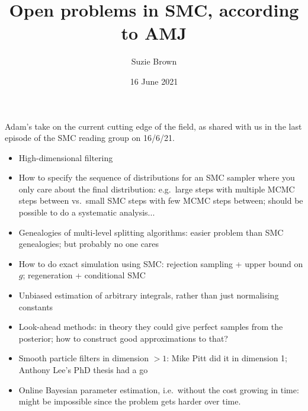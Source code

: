 \documentclass[fleqn]{article}
\title{Open problems in SMC, according to AMJ}
\author{Suzie Brown}
\date{16 June 2021}
\newcommand{\1}[1]{\mathbb{I}_{#1}}
\begin{document}
\maketitle
\thispagestyle{fancy}

Adam's take on the current cutting edge of the field, as shared with us in the last episode of the SMC reading group on 16/6/21.

\begin{itemize}
\item High-dimensional filtering
\item How to specify the sequence of distributions for an SMC sampler where you only care about the final distribution: e.g.\ large steps with multiple MCMC steps between vs.\ small SMC steps with few MCMC steps between; should be possible to do a systematic analysis...
\item Genealogies of multi-level splitting algorithms: easier problem than SMC genealogies; but probably no one cares
\item How to do exact simulation using SMC: rejection sampling + upper bound on $g$; regeneration + conditional SMC
\item Unbiased estimation of arbitrary integrals, rather than just normalising constants
\item Look-ahead methods: in theory they could give perfect samples from the posterior; how to construct good approximations to that?
\item Smooth particle filters in dimension $>1$: Mike Pitt did it in dimension 1; Anthony Lee's PhD thesis had a go
\item Online Bayesian parameter estimation, i.e.\ without the cost growing in time: might be impossible since the problem gets harder over time.
\end{itemize}
\end{document}
